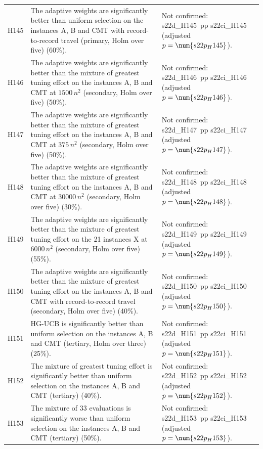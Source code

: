\begin{center}
\begin{longtable}{>{\raggedright\arraybackslash}p{0.9cm}>{\raggedright\arraybackslash}p{5.2cm}>{\raggedright\arraybackslash}p{8.5cm}}
H145 & The adaptive weights are significantly better than uniform selection on the instances A, B and CMT with record-to-record travel (primary, Holm over five) (60\%). & Not confirmed: \num{s22d_H145}~pp \num{s22ci_H145} (adjusted $p=\num{s22p_H145}$). \\
H146 & The adaptive weights are significantly better than the mixture of greatest tuning effort on the instances A, B and CMT at $1500\,n^2$ (secondary, Holm over five) (50\%). & Not confirmed: \num{s22d_H146}~pp \num{s22ci_H146} (adjusted $p=\num{s22p_H146}$). \\
H147 & The adaptive weights are significantly better than the mixture of greatest tuning effort on the instances A, B and CMT at $375\,n^2$ (secondary, Holm over five) (50\%). & Not confirmed: \num{s22d_H147}~pp \num{s22ci_H147} (adjusted $p=\num{s22p_H147}$). \\
H148 & The adaptive weights are significantly better than the mixture of greatest tuning effort on the instances A, B and CMT at $30000\,n^2$ (secondary, Holm over five) (30\%). & Not confirmed: \num{s22d_H148}~pp \num{s22ci_H148} (adjusted $p=\num{s22p_H148}$). \\
H149 & The adaptive weights are significantly better than the mixture of greatest tuning effort on the 21 instances X at $6000\,n^2$ (secondary, Holm over five) (55\%). & Not confirmed: \num{s22d_H149}~pp \num{s22ci_H149} (adjusted $p=\num{s22p_H149}$). \\
H150 & The adaptive weights are significantly better than the mixture of greatest tuning effort on the instances A, B and CMT with record-to-record travel (secondary, Holm over five) (40\%). & Not confirmed: \num{s22d_H150}~pp \num{s22ci_H150} (adjusted $p=\num{s22p_H150}$). \\
H151 & HG-UCB is significantly better than uniform selection on the instances A, B and CMT (tertiary, Holm over three) (25\%). & Not confirmed: \num{s22d_H151}~pp \num{s22ci_H151} (adjusted $p=\num{s22p_H151}$). \\
H152 & The mixture of greatest tuning effort is significantly better than uniform selection on the instances A, B and CMT (tertiary) (40\%). & Not confirmed: \num{s22d_H152}~pp \num{s22ci_H152} (adjusted $p=\num{s22p_H152}$). \\
H153 & The mixture of 33 evaluations is significantly worse than uniform selection on the instances A, B and CMT (tertiary) (50\%). & Not confirmed: \num{s22d_H153}~pp \num{s22ci_H153} (adjusted $p=\num{s22p_H153}$). \\

\end{longtable}
\end{center}
